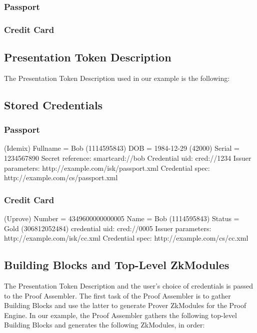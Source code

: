 \subsubsection{Passport}
{
  \footnotesize
  
}

\subsubsection{Credit Card}
{
  \footnotesize
  
}

\subsection{Presentation Token Description}
The Presentation Token Description used in our example is the following:
{
  \footnotesize
  
}

\subsection{Stored Credentials}
\subsubsection{Passport}
(Idemix)
Fullname = Bob (1114595843)
DOB = 1984-12-29 (42000)
Serial = 1234567890
Secret reference: smartcard://bob
Credential uid: cred://1234
Issuer parameters: http://example.com/isk/passport.xml
Credential spec: http://example.com/cs/passport.xml

\subsubsection{Credit Card}
(Uprove)
Number = 4349600000000005
Name = Bob (1114595843)
Status = Gold (306812052484)
credential uid: cred://0005
Issuer parameters: http://example.com/isk/cc.xml
Credential spec: http://example.com/cs/cc.xml
\fi


\subsection{Building Blocks and Top-Level ZkModules}
The Presentation Token Description and the user's choice of credentials is passed to the
Proof Assembler. The first task of the Proof Assembler is to gather Building Blocks
and use the latter to generate Prover ZkModules for the Proof Engine.
In our example, the Proof Assembler gathers the
following top-level Building Blocks and generates the following ZkModules, in order:

